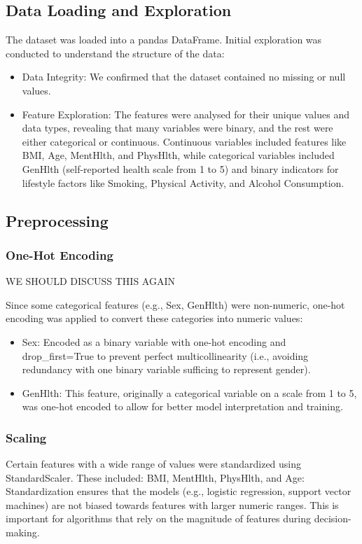 \documentclass[a4paper,12pt]{article}
\begin{document}
\subsection{Data Loading and Exploration}
The dataset was loaded into a pandas DataFrame. Initial exploration was conducted to understand 
the structure of the data:
\begin{itemize}
    \item Data Integrity: We confirmed that the dataset contained no missing or null values.
    \item Feature Exploration: The features were analysed for their unique values and data 
    types, revealing that many variables were binary, and the rest were either categorical or 
    continuous. Continuous variables included features like BMI, Age, MentHlth, and PhysHlth, 
    while categorical variables included GenHlth (self-reported health scale from 1 to 5) 
    and binary indicators for lifestyle factors like Smoking, Physical Activity, and Alcohol 
    Consumption.
\end{itemize}

\subsection{Preprocessing}
\subsubsection{One-Hot Encoding}
WE SHOULD DISCUSS THIS AGAIN

Since some categorical features (e.g., Sex, GenHlth) were non-numeric, one-hot encoding was 
applied to convert these categories into numeric values:
\begin{itemize}
    \item Sex: Encoded as a binary variable with one-hot encoding and drop\_first=True to prevent
    perfect multicollinearity (i.e., avoiding redundancy with one binary variable sufficing to 
    represent gender).
    \item GenHlth: This feature, originally a categorical variable on a scale from 1 to 5, 
    was one-hot encoded to allow for better model interpretation and training.
\end{itemize}

\subsubsection{Scaling}
Certain features with a wide range of values were standardized using StandardScaler. These included:
BMI, MentHlth, PhysHlth, and Age: Standardization ensures that the models 
(e.g., logistic regression, support vector machines) are not biased towards features with larger 
numeric ranges. This is important for algorithms that rely on the magnitude of features during 
decision-making.
\end{document}

